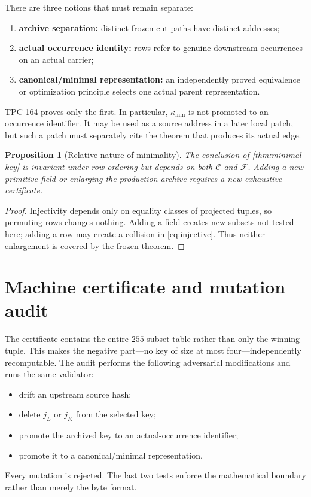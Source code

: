 \documentclass[11pt]{article}
\newtheorem{proposition}[theorem]{Proposition}
\theoremstyle{definition}
\theoremstyle{remark}
\newcommand{\Kmin}{\kappa_{\min}}
\newcommand{\Fdict}{\mathcal F}
\begin{document}
There are three notions that must remain separate:
\begin{enumerate}[leftmargin=2.1em]
 \item \textbf{archive separation:} distinct frozen cut paths have
       distinct addresses;
 \item \textbf{actual occurrence identity:} rows refer to genuine
       downstream occurrences on an actual carrier;
 \item \textbf{canonical/minimal representation:} an independently
       proved equivalence or optimization principle selects one
       actual parent representation.
\end{enumerate}
TPC-164 proves only the first.  In particular, \(\Kmin\) is not
promoted to an occurrence identifier.  It may be used as a source
address in a later local patch, but such a patch must separately cite
the theorem that produces its actual edge.

\begin{proposition}[Relative nature of minimality]\label{prop:relative}
The conclusion of \cref{thm:minimal-key} is invariant under row
ordering but depends on both \(\mathcal C\) and \(\Fdict\).  Adding a
new primitive field or enlarging the production archive requires a
new exhaustive certificate.
\end{proposition}

\begin{proof}
Injectivity depends only on equality classes of projected tuples, so
permuting rows changes nothing.  Adding a field creates new subsets
not tested here; adding a row may create a collision in
\eqref{eq:injective}.  Thus neither enlargement is covered by the
frozen theorem.
\end{proof}

\section{Machine certificate and mutation audit}

The certificate contains the entire \(255\)-subset table rather than
only the winning tuple.  This makes the negative part---no key of
size at most four---independently recomputable.  The audit performs
the following adversarial modifications and runs the same validator:
\begin{itemize}[leftmargin=2.1em]
 \item drift an upstream source hash;
 \item delete \(j_L\) or \(j_K\) from the selected key;
 \item promote the archived key to an actual-occurrence identifier;
 \item promote it to a canonical/minimal representation.
\end{itemize}
Every mutation is rejected.  The last two tests enforce the
mathematical boundary rather than merely the byte format.
\end{document}
